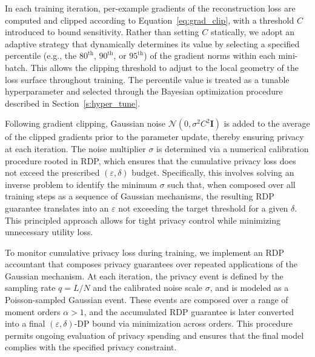

In each training iteration, per-example gradients of the reconstruction loss are computed and clipped according to Equation~\eqref{eq:grad_clip}, with a threshold \(C\) introduced to bound sensitivity. Rather than setting \(C\) statically, we adopt an adaptive strategy that dynamically determines its value by selecting a specified percentile (e.g., the \(80^{\text{th}}\), \(90^{\text{th}}\), or \(95^{\text{th}}\)) of the gradient norms within each mini-batch. This allows the clipping threshold to adjust to the local geometry of the loss surface throughout training. The percentile value is treated as a tunable hyperparameter and selected through the Bayesian optimization procedure described in Section~\ref{s:hyper_tune}.

Following gradient clipping, Gaussian noise \(\mathcal{N}(0, \sigma^2 C^2 \mathbf{I})\) is added to the average of the clipped gradients prior to the parameter update, thereby ensuring privacy at each iteration. The noise multiplier \(\sigma\) is determined via a numerical calibration procedure rooted in RDP, which ensures that the cumulative privacy loss does not exceed the prescribed \((\varepsilon, \delta)\) budget. Specifically, this involves solving an inverse problem to identify the minimum \(\sigma\) such that, when composed over all training steps as a sequence of Gaussian mechanisms, the resulting RDP guarantee translates into an \(\varepsilon\) not exceeding the target threshold for a given \(\delta\). This principled approach allows for tight privacy control while minimizing unnecessary utility loss.

To monitor cumulative privacy loss during training, we implement an RDP accountant that composes privacy guarantees over repeated applications of the Gaussian mechanism. At each iteration, the privacy event is defined by the sampling rate \(q = L/N\) and the calibrated noise scale \(\sigma\), and is modeled as a Poisson-sampled Gaussian event. These events are composed over a range of moment orders \(\alpha > 1\), and the accumulated RDP guarantee is later converted into a final \((\varepsilon, \delta)\)-DP bound via minimization across orders. This procedure permits ongoing evaluation of privacy spending and ensures that the final model complies with the specified privacy constraint.

